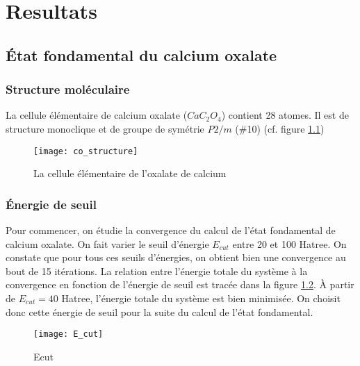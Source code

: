 \chapter{Resultats}


\label{Chap-Res}

\section{État fondamental du calcium oxalate}
\subsection{Structure moléculaire}
La cellule élémentaire de calcium oxalate ($Ca C_2 O_4$) contient 28 atomes. Il est de structure monoclique et de groupe de symétrie $P2/m$ ($\#$10) (cf. figure \ref{BrillouinZone})

\begin{figure}[!h]\label{BrillouinZone}
    \centering
    \texttt{[image: co\_structure]}
    \caption{La cellule élémentaire de l'oxalate de calcium}
\end{figure}
\subsection{Énergie de seuil}
Pour commencer, on étudie la convergence du calcul de l'état fondamental de calcium oxalate. On fait varier le seuil d'énergie $E_{cut}$ entre 20 et 100 Hatree. 
On constate que pour tous ces seuils d'énergies, on obtient bien une convergence au bout de 15 itérations. La relation entre l'énergie totale du système à la convergence en fonction de l'énergie de seuil est tracée dans la figure \ref{Ecut}. 
À partir de $E_{cut} = 40$ Hatree, l'énergie totale du système est bien minimisée. On choisit donc cette énergie de seuil pour la suite du calcul de l'état fondamental. 

\begin{figure}[!h]\label{Ecut}
    \centering
    \texttt{[image: E\_cut]}
    \caption{Ecut}
\end{figure}

